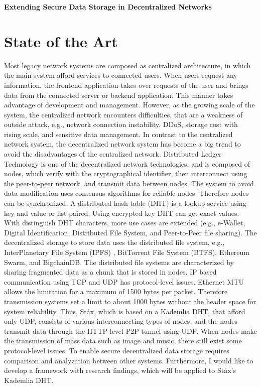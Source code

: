\documentclass{article}
\begin{document}


{\huge  \textbf {Extending Secure Data Storage in Decentralized Networks}}\\
\section{State of the Art}
Most legacy network systems are composed as centralized architecture, in which the main system afford services to connected users. When users request any information, the frontend application takes over requests of the user and brings data from the connected server or backend application. This manner takes advantage of development and management. However, as the growing scale of the system, the centralized network encounters difficulties, that are a weakness of outside attack, e.g., network connection instability, DDoS, storage cost with rising scale, and sensitive data management. In contrast to the centralized network system, the decentralized network system has become a big trend to avoid the disadvantages of the centralized network. Distributed Ledger Technology is one of the decentralized network technologies, and is composed of nodes, which verify with the cryptographical identifier, then interconnect using the peer-to-peer network, and transmit data between nodes. The system to avoid data modification uses consensus algorithms for reliable nodes. Therefore nodes can be synchronized. A distributed hash table (DHT) \cite{sivaraja2008efficient} is a lookup service using key and value or list paired. Using encrypted key DHT can get exact values. With distinguish DHT characters, more use cases are extended (e.g., e-Wallet, Digital Identification, Distributed File System, and Peer-to-Peer file sharing). The decentralized storage to store data uses the distributed file system, e.g., InterPlanetary File System (IPFS) \cite{IPFS}\cite{benet2014ipfs}, BitTorrent File System (BTFS)\cite{BTFS}, Ethereum Swarm, and BigchainDB. The distributed file systems are characterized by sharing fragmented data as a chunk that is stored in nodes. IP based communication using TCP and UDP has protocol-level issues\cite{rfc791}\cite{rfc815}. Ethernet MTU allows the limitation for a maximum of 1500 bytes per packet. Therefore transmission systems set a limit to about 1000 bytes without the header space for system reliability\cite{ietf-intarea-frag-fragile-17}. Thus, St\aa x, which is based on a Kademlia DHT\cite{maymounkov2002kademlia}, that afford only UDP, consists of various interconnecting types of nodes, and the nodes transmit data through the HTTP-level P2P tunnel using UDP. When nodes make the transmission of mass data such as image and music, there still exist some protocol-level issues. To enable secure decentralized data storage requires comparison and analyzation between other systems. Furthermore, I would like to develop a framework with research findings, which will be applied to St\aa x's Kademlia DHT.
\end{document}
